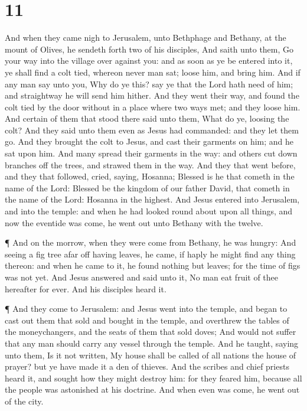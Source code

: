 \hypertarget{section-10}{%
\section{11}\label{section-10}}

 And when they came nigh to Jerusalem, unto Bethphage and
Bethany, at the mount of Olives, he sendeth forth two of his disciples,
 And saith unto them, Go your way into the village over
against you: and as soon as ye be entered into it, ye shall find a colt
tied, whereon never man sat; loose him, and bring him.  And
if any man say unto you, Why do ye this? say ye that the Lord hath need
of him; and straightway he will send him hither.  And they
went their way, and found the colt tied by the door without in a place
where two ways met; and they loose him.  And certain of them
that stood there said unto them, What do ye, loosing the colt?
 And they said unto them even as Jesus had commanded: and
they let them go.  And they brought the colt to Jesus, and
cast their garments on him; and he sat upon him.  And many
spread their garments in the way: and others cut down branches off the
trees, and strawed them in the way.  And they that went
before, and they that followed, cried, saying, Hosanna; Blessed is he
that cometh in the name of the Lord:  Blessed be the
kingdom of our father David, that cometh in the name of the Lord:
Hosanna in the highest.  And Jesus entered into Jerusalem,
and into the temple: and when he had looked round about upon all things,
and now the eventide was come, he went out unto Bethany with the twelve.

 ¶ And on the morrow, when they were come from Bethany, he
was hungry:  And seeing a fig tree afar off having leaves,
he came, if haply he might find any thing thereon: and when he came to
it, he found nothing but leaves; for the time of figs was not yet.
 And Jesus answered and said unto it, No man eat fruit of
thee hereafter for ever. And his disciples heard it.

 ¶ And they come to Jerusalem: and Jesus went into the
temple, and began to cast out them that sold and bought in the temple,
and overthrew the tables of the moneychangers, and the seats of them
that sold doves;  And would not suffer that any man should
carry any vessel through the temple.  And he taught, saying
unto them, Is it not written, My house shall be called of all nations
the house of prayer? but ye have made it a den of thieves. 
And the scribes and chief priests heard it, and sought how they might
destroy him: for they feared him, because all the people was astonished
at his doctrine.  And when even was come, he went out of
the city.

